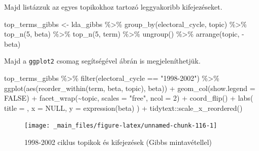 \documentclass[
]{book}
\newenvironment{Shaded}{\begin{snugshade}}{\end{snugshade}}
\newcommand{\AttributeTok}[1]{\textcolor[rgb]{0.77,0.63,0.00}{#1}}
\newcommand{\ConstantTok}[1]{\textcolor[rgb]{0.00,0.00,0.00}{#1}}
\newcommand{\DecValTok}[1]{\textcolor[rgb]{0.00,0.00,0.81}{#1}}
\newcommand{\FunctionTok}[1]{\textcolor[rgb]{0.00,0.00,0.00}{#1}}
\newcommand{\NormalTok}[1]{#1}
\newcommand{\OtherTok}[1]{\textcolor[rgb]{0.56,0.35,0.01}{#1}}
\newcommand{\SpecialCharTok}[1]{\textcolor[rgb]{0.00,0.00,0.00}{#1}}
\newcommand{\StringTok}[1]{\textcolor[rgb]{0.31,0.60,0.02}{#1}}
\begin{document}
Majd listázzuk az egyes topikokhoz tartozó leggyakoribb kifejezéseket.

\begin{Shaded}
\begin{Highlighting}[]
\NormalTok{top\_terms\_gibbs }\OtherTok{\textless{}{-}}\NormalTok{ lda\_gibbs }\SpecialCharTok{\%\textgreater{}\%}
  \FunctionTok{group\_by}\NormalTok{(electoral\_cycle, topic) }\SpecialCharTok{\%\textgreater{}\%}
  \FunctionTok{top\_n}\NormalTok{(}\DecValTok{5}\NormalTok{, beta) }\SpecialCharTok{\%\textgreater{}\%}
  \FunctionTok{top\_n}\NormalTok{(}\DecValTok{5}\NormalTok{, term) }\SpecialCharTok{\%\textgreater{}\%}
  \FunctionTok{ungroup}\NormalTok{() }\SpecialCharTok{\%\textgreater{}\%}
  \FunctionTok{arrange}\NormalTok{(topic, }\SpecialCharTok{{-}}\NormalTok{beta)}
\end{Highlighting}
\end{Shaded}

Majd a \texttt{ggplot2} csomag segítségével ábrán is megjeleníthetjük.

\begin{Shaded}
\begin{Highlighting}[]
\NormalTok{top\_terms\_gibbs }\SpecialCharTok{\%\textgreater{}\%}
  \FunctionTok{filter}\NormalTok{(electoral\_cycle }\SpecialCharTok{==} \StringTok{"1998{-}2002"}\NormalTok{) }\SpecialCharTok{\%\textgreater{}\%}
  \FunctionTok{ggplot}\NormalTok{(}\FunctionTok{aes}\NormalTok{(}\FunctionTok{reorder\_within}\NormalTok{(term, beta, topic), beta)) }\SpecialCharTok{+}
  \FunctionTok{geom\_col}\NormalTok{(}\AttributeTok{show.legend =} \ConstantTok{FALSE}\NormalTok{) }\SpecialCharTok{+}
  \FunctionTok{facet\_wrap}\NormalTok{(}\SpecialCharTok{\textasciitilde{}}\NormalTok{topic, }\AttributeTok{scales =} \StringTok{"free"}\NormalTok{, }\AttributeTok{ncol =} \DecValTok{2}\NormalTok{) }\SpecialCharTok{+}
  \FunctionTok{coord\_flip}\NormalTok{() }\SpecialCharTok{+}
  \FunctionTok{labs}\NormalTok{(}
    \AttributeTok{title =}\NormalTok{ ,}
    \AttributeTok{x =} \ConstantTok{NULL}\NormalTok{,}
    \AttributeTok{y =} \FunctionTok{expression}\NormalTok{(beta)}
\NormalTok{  ) }\SpecialCharTok{+}
\NormalTok{  tidytext}\SpecialCharTok{::}\FunctionTok{scale\_x\_reordered}\NormalTok{()}
\end{Highlighting}
\end{Shaded}

\begin{figure}

{\centering \texttt{[image: \_main\_files/figure-latex/unnamed-chunk-116-1]} 

}

\caption{1998-2002 ciklus topikok és kifejezések (Gibbs mintavétellel)}\label{fig:unnamed-chunk-116}
\end{figure}
\end{document}

